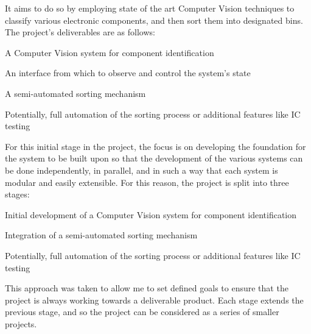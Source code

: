 It aims to do so by employing state of the art Computer Vision techniques to classify various electronic components,
and then sort them into designated bins. The project's deliverables are as follows:
\begin{mylist}
  \item A Computer Vision system for component identification
  \item An interface from which to observe and control the system's state
  \item A semi-automated sorting mechanism
  \item Potentially, full automation of the sorting process or additional features like IC testing
\end{mylist}

\noindent
For this initial stage in the project, the focus is on developing the foundation for the system to be built upon so that
the development of the various systems can be done independently, in parallel, and in such a way that each system
is modular and easily extensible. For this reason, the project is split into three stages:
\begin{mylist}
  \item Initial development of a Computer Vision system for component identification
  \item Integration of a semi-automated sorting mechanism
  \item Potentially, full automation of the sorting process or additional features like IC testing
\end{mylist}
This approach was taken to allow me to set defined goals to ensure that the project is always working towards a deliverable product.
Each stage extends the previous stage, and so the project can be considered as a series of smaller projects. 
